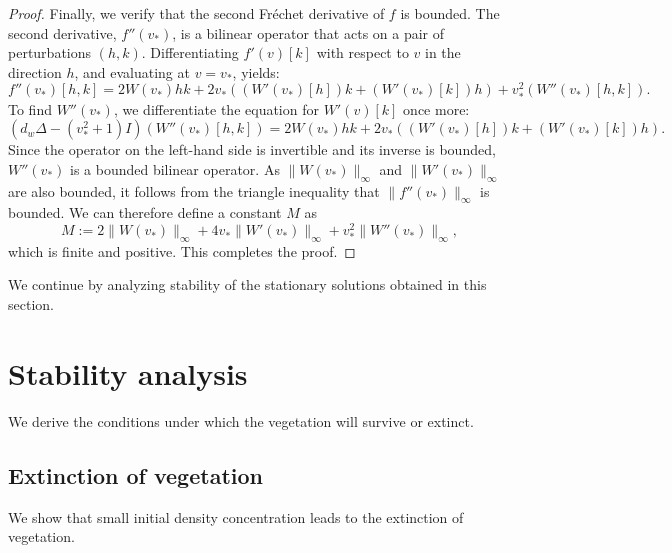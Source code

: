 \documentclass[11pt, a4paper]{article}
\theoremstyle{break}
\theoremstyle{break}
\theoremstyle{break}
\theoremstyle{break}
\theoremstyle{break}
\theoremstyle{break}
\theoremstyle{break}
\theoremstyle{break}
\theoremstyle{break}
\begin{document}
\begin{proof}
    Finally, we verify that the second Fr\'echet derivative of $f$ is bounded. The second derivative, $f''(v_*)$, is a bilinear operator that acts on a pair of perturbations $(h, k)$. Differentiating $f'(v)[k]$ with respect to $v$ in the direction $h$, and evaluating at $v=v_*$, yields:
    \begin{equation*}
        f''(v_*)[h, k] = 2W(v_*)hk + 2v_*\left( (W'(v_*)[h])k + (W'(v_*)[k])h \right) + v_*^2(W''(v_*)[h,k]).
    \end{equation*}
    To find $W''(v_*)$, we differentiate the equation for $W'(v)[k]$ once more:
    \begin{equation*}
        (d_w \Delta - (v_*^2+1)I)(W''(v_*)[h, k]) = 2W(v_*)hk + 2v_*\left( (W'(v_*)[h])k + (W'(v_*)[k])h \right).
    \end{equation*}
    Since the operator on the left-hand side is invertible and its inverse is bounded, $W''(v_*)$ is a bounded bilinear operator. As $\|W(v_*)\|_\infty$ and $\|W'(v_*)\|_\infty$ are also bounded, it follows from the triangle inequality that $\|f''(v_*)\|_\infty$ is bounded. We can therefore define a constant $M$ as
    \begin{equation*}
        M := 2\|W(v_*)\|_\infty + 4v_*\|W'(v_*)\|_\infty + v_*^2\|W''(v_*)\|_\infty,
    \end{equation*}
    which is finite and positive. This completes the proof.
\end{proof}

We continue by analyzing stability of the stationary solutions obtained in this section.
\section{Stability analysis}

We derive the conditions under which the vegetation will survive or extinct.

\subsection{Extinction of vegetation} We show that small initial density concentration leads to the extinction of vegetation.
\end{document}
